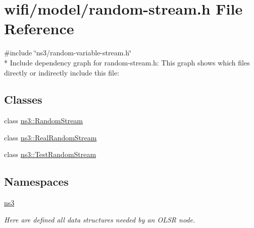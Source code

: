 \hypertarget{random-stream_8h}{}\section{wifi/model/random-\/stream.h File Reference}
\label{random-stream_8h}
{\ttfamily \#include \char`\"{}ns3/random-\/variable-\/stream.\+h\char`\"{}}\\*
Include dependency graph for random-\/stream.h\+:
This graph shows which files directly or indirectly include this file\+:
\subsection*{Classes}
\begin{DoxyCompactItemize}
\item 
class \hyperlink{classns3_1_1RandomStream}{ns3\+::\+Random\+Stream}
\item 
class \hyperlink{classns3_1_1RealRandomStream}{ns3\+::\+Real\+Random\+Stream}
\item 
class \hyperlink{classns3_1_1TestRandomStream}{ns3\+::\+Test\+Random\+Stream}
\end{DoxyCompactItemize}
\subsection*{Namespaces}
\begin{DoxyCompactItemize}
\item 
 \hyperlink{namespacens3}{ns3}
\begin{DoxyCompactList}\small\item\em Here are defined all data structures needed by an O\+L\+SR node. \end{DoxyCompactList}\end{DoxyCompactItemize}
